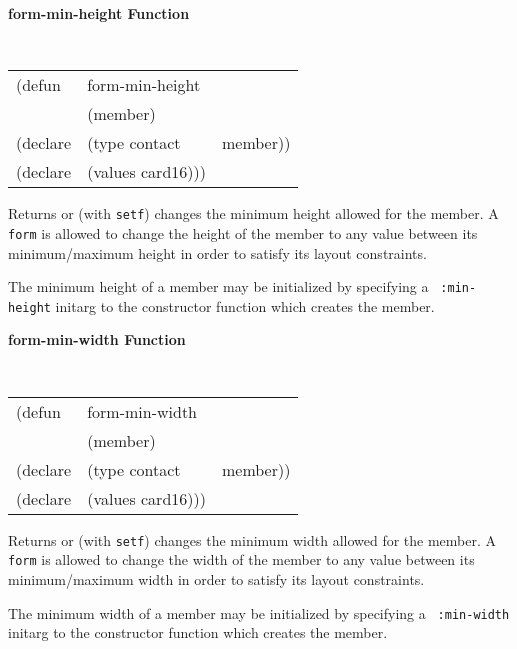  
{\samepage  
{\large {\bf form-min-height \hfill Function}}
\begin{flushright} \parbox[t]{6.125in}{
\tt
\begin{tabular}{lll}
\raggedright
(defun & form-min-height & \\
& (member) \\
(declare &(type contact & member))\\
(declare & (values card16)))
\end{tabular}
\rm

}\end{flushright}}



\begin{flushright} \parbox[t]{6.125in}{
Returns or (with {\tt setf}) changes the minimum
            height allowed for the member.  A {\tt form} is allowed to change the
            height of the member to any value between its minimum/maximum height
in order to satisfy
            its layout constraints.

The minimum height of a member may be initialized by specifying a {\tt
:min-height} initarg to the constructor function which creates the member.
}
\end{flushright}



 

{\samepage  
{\large {\bf form-min-width \hfill Function}}
\begin{flushright} \parbox[t]{6.125in}{
\tt
\begin{tabular}{lll}
\raggedright
(defun & form-min-width & \\
& (member) \\
(declare &(type contact & member))\\
(declare & (values card16)))
\end{tabular}
\rm

}\end{flushright}}



\begin{flushright} \parbox[t]{6.125in}{
Returns or (with {\tt setf}) changes the minimum
            width allowed for the member.  A {\tt form} is allowed to change the
            width of the member to any value between its minimum/maximum width
in order to satisfy
            its layout constraints.

The minimum width of a member may be initialized by specifying a {\tt
:min-width} initarg to the constructor function which creates the member.
}
\end{flushright}



